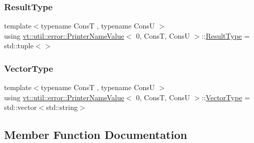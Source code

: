 \subsubsection{\texorpdfstring{Result\+Type}{ResultType}}
{\footnotesize\ttfamily template$<$typename ConsT , typename ConsU $>$ \\
using \hyperlink{structvt_1_1util_1_1error_1_1_printer_name_value}{vt\+::util\+::error\+::\+Printer\+Name\+Value}$<$ 0, ConsT, ConsU $>$\+::\hyperlink{structvt_1_1util_1_1error_1_1_printer_name_value_3_010_00_01_cons_t_00_01_cons_u_01_4_a39a8221374942d5d98a1f062072755ae}{Result\+Type} =  std\+::tuple$<$$>$}

\mbox{\label{structvt_1_1util_1_1error_1_1_printer_name_value_3_010_00_01_cons_t_00_01_cons_u_01_4_a1578540c95029bb5f6a8345efe655486}} 
\subsubsection{\texorpdfstring{Vector\+Type}{VectorType}}
{\footnotesize\ttfamily template$<$typename ConsT , typename ConsU $>$ \\
using \hyperlink{structvt_1_1util_1_1error_1_1_printer_name_value}{vt\+::util\+::error\+::\+Printer\+Name\+Value}$<$ 0, ConsT, ConsU $>$\+::\hyperlink{structvt_1_1util_1_1error_1_1_printer_name_value_3_010_00_01_cons_t_00_01_cons_u_01_4_a1578540c95029bb5f6a8345efe655486}{Vector\+Type} =  std\+::vector$<$std\+::string$>$}



\subsection{Member Function Documentation}
\mbox{\label{structvt_1_1util_1_1error_1_1_printer_name_value_3_010_00_01_cons_t_00_01_cons_u_01_4_a05fa4e230882589626596a4b45472af8}} 
